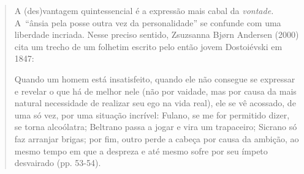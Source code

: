 {\begin{quote}
A (des)vantagem quintessencial é a expressão mais cabal da
\emph{vontade.} A~``ânsia pela posse outra vez da personalidade'' se
confunde com uma liberdade incriada. Nesse preciso sentido, Zsuzsanna
Bjørn Andersen (2000) cita um trecho de um folhetim escrito pelo então
jovem Dostoiévski em 1847:

Quando um homem está insatisfeito, quando ele não consegue se expressar
e revelar o que há de melhor nele (não por vaidade, mas por causa da
mais natural necessidade de realizar seu ego na vida real), ele se vê
acossado, de uma só vez, por uma situação incrível: Fulano, se me for
permitido dizer, se torna alcoólatra; Beltrano passa a jogar e vira um
trapaceiro; Sicrano só faz arranjar brigas; por fim, outro perde a
cabeça por causa da ambição, ao mesmo tempo em que a despreza e até
mesmo sofre por seu ímpeto desvairado (pp. 53-54).


\end{quote}}
